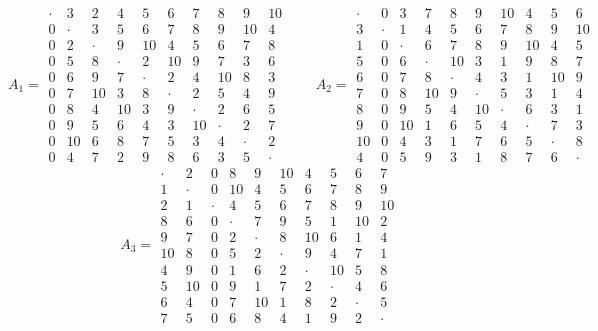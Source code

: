 \documentclass[11pt]{amsart}
\theoremstyle{definition}\newtheorem{definition}[theorem]{Definition}
\theoremstyle{remark}\newtheorem{remark}[theorem]{Remark}
\newcommand{\MOAS}{\mathrm{MOAS}}
\begin{document}
\begin{table}[ht]
\centering\footnotesize
\setlength{\arraycolsep}{2.6pt}
\[
A_1=\begin{array}{cccccccccc}
\cdot&3&2&4&5&6&7&8&9&10\\
0&\cdot&3&5&6&7&8&9&10&4\\
0&2&\cdot&9&10&4&5&6&7&8\\
0&5&8&\cdot&2&10&9&7&3&6\\
0&6&9&7&\cdot&2&4&10&8&3\\
0&7&10&3&8&\cdot&2&5&4&9\\
0&8&4&10&3&9&\cdot&2&6&5\\
0&9&5&6&4&3&10&\cdot&2&7\\
0&10&6&8&7&5&3&4&\cdot&2\\
0&4&7&2&9&8&6&3&5&\cdot
\end{array}\qquad
A_2=\begin{array}{cccccccccc}
\cdot&0&3&7&8&9&10&4&5&6\\
3&\cdot&1&4&5&6&7&8&9&10\\
1&0&\cdot&6&7&8&9&10&4&5\\
5&0&6&\cdot&10&3&1&9&8&7\\
6&0&7&8&\cdot&4&3&1&10&9\\
7&0&8&10&9&\cdot&5&3&1&4\\
8&0&9&5&4&10&\cdot&6&3&1\\
9&0&10&1&6&5&4&\cdot&7&3\\
10&0&4&3&1&7&6&5&\cdot&8\\
4&0&5&9&3&1&8&7&6&\cdot
\end{array}
\]
\[
A_3=\begin{array}{cccccccccc}
\cdot&2&0&8&9&10&4&5&6&7\\
1&\cdot&0&10&4&5&6&7&8&9\\
2&1&\cdot&4&5&6&7&8&9&10\\
8&6&0&\cdot&7&9&5&1&10&2\\
9&7&0&2&\cdot&8&10&6&1&4\\
10&8&0&5&2&\cdot&9&4&7&1\\
4&9&0&1&6&2&\cdot&10&5&8\\
5&10&0&9&1&7&2&\cdot&4&6\\
6&4&0&7&10&1&8&2&\cdot&5\\
7&5&0&6&8&4&1&9&2&\cdot
\end{array}
\]
\caption{A $\MOAS(10,3)$ with positions $1,2,3$. Rows and columns are indexed $1,\dots,10$; the entry in row $x$ and
column $y$ of $A_i$ is $A_i(x,y)$.}\label{tab:ten}
\end{table}
\end{document}
